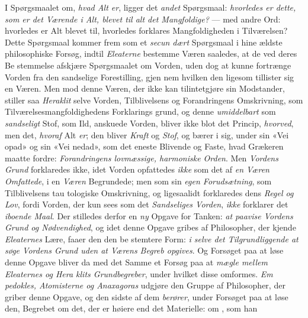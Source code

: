 I Spørgsmaalet om, \emph{hvad Alt er}, ligger det \emph{andet}
Spørgsmaal: \emph{hvorledes er dette, som er det Værende i
Alt, blevet til alt det Mangfoldige?} --- med andre Ord:
hvorledes er Alt blevet til, hvorledes forklares Mangfoldigheden
i Tilværelsen? Dette Spørgsmaal kommer frem som et \emph{secun\-%
dært} Spørgsmaal i hine ældste philosophiske Forsøg, indtil
\emph{Eleaterne} bestemme Væren saaledes, at de ved deres Be\-%
stemmelse afskjære Spørgsmaalet om Vorden, uden dog at
kunne fortrænge Vorden fra den sandselige Forestilling, gjen\-%
nem hvilken den ligesom tillister sig en Væren. Men mod
 denne Væren, der ikke kan tilintetgjøre sin Modstander, stiller
saa \emph{Heraklit} selve Vorden, Tilblivelsens og Forandringens
Omskrivning, som Tilværelsesmangfoldighedens Forklarings\-%
grund, og denne \emph{umiddelbart} som \emph{sandseligt} Stof, som
Ild, anskuede Vorden, bliver ikke blot det Princip, \emph{hvorved},
men det, \emph{hvoraf} Alt \emph{er}; den bliver \emph{Kraft} og \emph{Stof}, og
bærer i sig, under sin «Vei opad» og sin «Vei nedad», som
det eneste Blivende og Faste, hvad Grækeren maatte fordre:
\emph{Forandringens lovmæssige, harmoniske Orden}. Men
\emph{Vordens Grund} forklaredes ikke, idet Vorden opfattedes \emph{ikke}
som det af \emph{en Væren Omfattede}, i en \emph{Væren} Begrundede;
men som sin \emph{egen Forudsætning}, som Tilblivelsens tau\-%
tologiske Omskrivning, og ligesaalidt forklaredes dens \emph{Regel
og Lov}, fordi Vorden, der kun sees som det \emph{Sandseliges
Vorden}, \emph{ikke} forklarer det \emph{iboende Maal}. Der stilledes
derfor en \emph{ny} Opgave for Tanken: \emph{at paavise Vordens
Grund og Nødvendighed}, og idet denne Opgave gribes af
Philosopher, der kjende \emph{Eleaternes} Lære, faaer den den be\-%
stemtere Form: \emph{i selve det Tilgrundliggende at søge
Vordens Grund uden at Værens Begreb opgives}. Og
Forsøget paa at løse denne Opgave bliver da med det Samme
et Forsøg paa at \emph{mægle mellem Eleaternes og Hera\-%
klits Grundbegreber}, under hvilket disse omformes. \emph{Em\-%
pedokles, Atomisterne og Anaxagoras} udgjøre den
Gruppe af Philosopher, der griber denne Opgave, og den sidste
af dem \emph{berører}, under Forsøget paa at løse den, Begrebet
om det, der er høiere end det Materielle: om , som han
